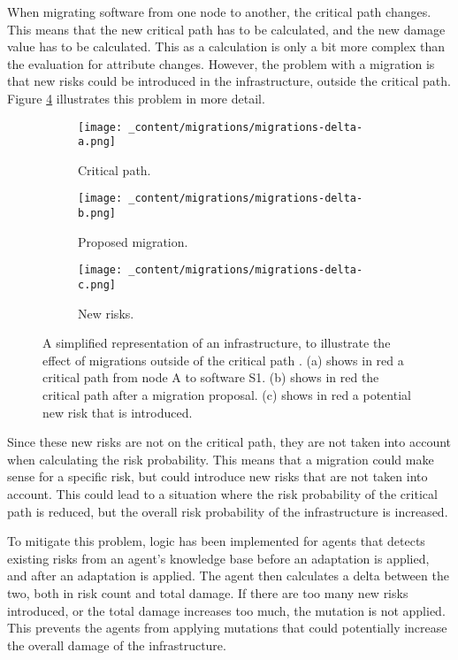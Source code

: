When migrating software from one node to another, the critical path changes. This means that the new critical path has to be calculated, and the new damage value has to be calculated. This as a calculation is only a bit more complex than the evaluation for attribute changes. However, the problem with a migration is that new risks could be introduced in the infrastructure, outside the critical path. Figure \ref{fig:migrations-delta} illustrates this problem in more detail.

\begin{figure}[H]
    \begin{subfigure}[b]{0.3\textwidth}
        \centering
        \texttt{[image: \_content/migrations/migrations-delta-a.png]}
        \caption{Critical path.}
        \label{fig:migrations-delta-attack}
    \end{subfigure}
    \begin{subfigure}[b]{0.3\textwidth}
        \centering
        \texttt{[image: \_content/migrations/migrations-delta-b.png]}
        \caption{Proposed migration.}
        \label{fig:migrations-delta-proposal}
    \end{subfigure}
    \begin{subfigure}[b]{0.3\textwidth}
        \centering
        \texttt{[image: \_content/migrations/migrations-delta-c.png]}
        \caption{New risks.}
        \label{fig:migrations-delta-risks}
    \end{subfigure}
    \caption{A simplified representation of an infrastructure, to illustrate the effect of migrations outside of the critical path . (a) shows in red a critical path from node A to software S1. (b) shows in red the critical path after a migration proposal. (c) shows in red a potential new risk that is introduced.}
    \label{fig:migrations-delta}
\end{figure}

Since these new risks are not on the critical path, they are not taken into account when calculating the risk probability. This means that a migration could make sense for a specific risk, but could introduce new risks that are not taken into account. This could lead to a situation where the risk probability of the critical path is reduced, but the overall risk probability of the infrastructure is increased. 

To mitigate this problem, logic has been implemented for agents that detects existing risks from an agent's knowledge base before an adaptation is applied, and after an adaptation is applied. The agent then calculates a delta between the two, both in risk count and total damage. If there are too many new risks introduced, or the total damage increases too much, the mutation is not applied. This prevents the agents from applying mutations that could potentially increase the overall damage of the infrastructure.
